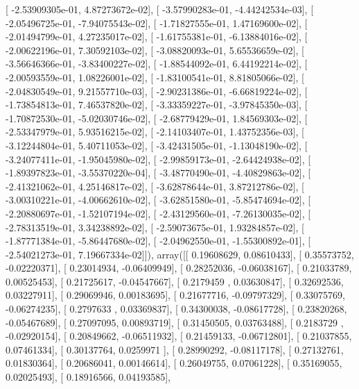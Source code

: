 \documentclass{article}
\begin{document}
       [ -2.53909305e-01,   4.87273672e-02],
       [ -3.57990283e-01,  -4.44242534e-03],
       [ -2.05496725e-01,  -7.94075543e-02],
       [ -1.71827555e-01,   1.47169600e-02],
       [ -2.01494799e-01,   4.27235017e-02],
       [ -1.61755381e-01,  -6.13884016e-02],
       [ -2.00622196e-01,   7.30592103e-02],
       [ -3.08820093e-01,   5.65536659e-02],
       [ -3.56646366e-01,  -3.83400227e-02],
       [ -1.88544092e-01,   6.44192214e-02],
       [ -2.00593559e-01,   1.08226001e-02],
       [ -1.83100541e-01,   8.81805066e-02],
       [ -2.04830549e-01,   9.21557710e-03],
       [ -2.90231386e-01,  -6.66819224e-02],
       [ -1.73854813e-01,   7.46537820e-02],
       [ -3.33359227e-01,  -3.97845350e-03],
       [ -1.70872530e-01,  -5.02030746e-02],
       [ -2.68779429e-01,   1.84569303e-02],
       [ -2.53347979e-01,   5.93516215e-02],
       [ -2.14103407e-01,   1.43752356e-03],
       [ -3.12244804e-01,   5.40711053e-02],
       [ -3.42431505e-01,  -1.13048190e-02],
       [ -3.24077411e-01,  -1.95045980e-02],
       [ -2.99859173e-01,  -2.64424938e-02],
       [ -1.89397823e-01,  -3.55370220e-04],
       [ -3.48770490e-01,  -4.40829863e-02],
       [ -2.41321062e-01,   4.25146817e-02],
       [ -3.62878644e-01,   3.87212786e-02],
       [ -3.00310221e-01,  -4.00662610e-02],
       [ -3.62851580e-01,  -5.85474694e-02],
       [ -2.20880697e-01,  -1.52107194e-02],
       [ -2.43129560e-01,  -7.26130035e-02],
       [ -2.78313519e-01,   3.34238892e-02],
       [ -2.59073675e-01,   1.93284857e-02],
       [ -1.87771384e-01,  -5.86447680e-02],
       [ -2.04962550e-01,  -1.55300892e-01],
       [ -2.54021273e-01,   7.19667334e-02]]), array([[ 0.19608629,  0.08610433],
       [ 0.35573752, -0.02220371],
       [ 0.23014934, -0.06409949],
       [ 0.28252036, -0.06038167],
       [ 0.21033789,  0.00525453],
       [ 0.21725617, -0.04547667],
       [ 0.2179459 ,  0.03630847],
       [ 0.32692536,  0.03227911],
       [ 0.29069946,  0.00183695],
       [ 0.21677716, -0.09797329],
       [ 0.33075769, -0.06274235],
       [ 0.2797633 ,  0.03369837],
       [ 0.34300038, -0.08617728],
       [ 0.23820268, -0.05467689],
       [ 0.27097095,  0.00893719],
       [ 0.31450505,  0.03763488],
       [ 0.2183729 , -0.02920154],
       [ 0.20849662, -0.06511932],
       [ 0.21459133, -0.06712801],
       [ 0.21037855,  0.07461334],
       [ 0.30137764,  0.0259971 ],
       [ 0.28990292, -0.08117178],
       [ 0.27132761,  0.01830364],
       [ 0.20686041,  0.00146614],
       [ 0.26049755,  0.07061228],
       [ 0.35169055,  0.02025493],
       [ 0.18916566,  0.04193585],
\end{document}
